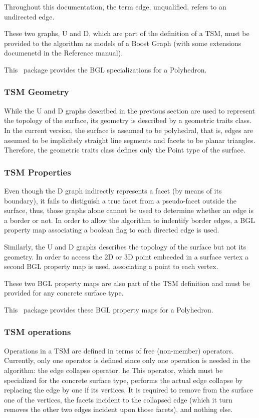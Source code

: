 Throughout this documentation, the term edge, unqualified, refers to an undirected edge.

These two graphs, U and D, which are part of the definition of a TSM, must be provided to the algorithm as models of a Boost Graph (with some extensions documenetd in the Reference manual).

This \cgal\ package provides the BGL specializations for a Polyhedron.

\subsubsection{TSM Geometry}

While the U and D graphs described in the previous section are used to represent the topology of the surface, its geometry is described by a geometric traits class. In the current version, the surface is assumed to be polyhedral, that is, edges are assumed to be implicitely straight line segments and facets to be planar triangles. Therefore, the geometric traits class defines only the Point type of the surface.

\subsubsection{TSM Properties}

Even though the D graph indirectly represents a facet (by means of its boundary), it fails to distiguish a true facet from a pseudo-facet outside the surface, thus, those graphs alone cannot be used to determine whether an edge is a border or not. In order to allow the algorithm to indentify border edges, a BGL property map associating a boolean flag to each directed edge is used.

Similarly, the U and D graphs describes the topology of the surface but not its geometry. In order to access the 2D or 3D point embeeded in a surface vertex a second BGL property map is used, associating a point to each vertex.

These two BGL property maps are also part of the TSM definition and must be provided for any concrete surface type.

This \cgal\ package provides these BGL property maps for a Polyhedron.

\subsubsection{TSM operations}

Operations in a TSM are defined in terms of free (non-member) operators.
Currently, only one operator is defined since only one operation is needed in the algorithm: the edge collapse operator.
he 
This operator, which must be specialized for the concrete surface type, performs the actual edge collapse by replacing the edge by one if its vertices. It is required to remove from the surface one of the vertices, the facets incident to the collapsed edge (which it turn removes the other two edges incident upon those facets), and nothing else.

